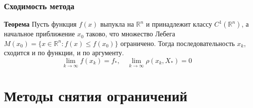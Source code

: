 \documentclass[A4]{article}
\begin{document}
\subsubsection{Сходимость метода} 
\textbf{Теорема} Пусть функция $f(x)$ выпукла на $\mathbb{R}^n$ и принадлежит классу $C^1(\mathbb{R}^n)$, а начальное приближение $x_0$ таково, что множество Лебега $M(x_0)=\{x\in\mathbb{R}^n:f(x)\leqslant f(x_0) \}$ ограничено. Тогда последовательность $x_k$, сходится и по функции, и по аргументу.
\begin{equation*}
\lim_{k\rightarrow\infty}f(x_k)=f_*,\quad\lim_{k\rightarrow\infty}\rho(x_k,X_*)=0
\end{equation*} 
\section{Методы снятия ограничений}
\end{document}
